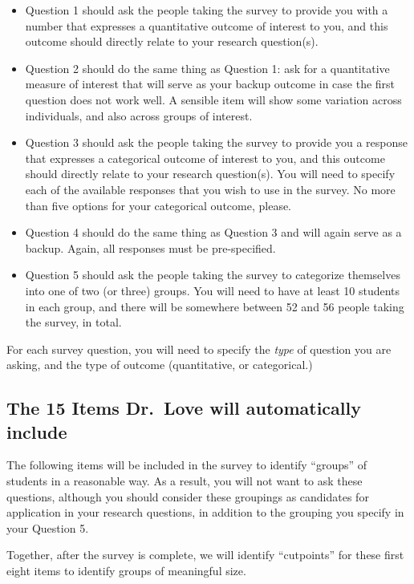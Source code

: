 \documentclass[]{book}
\providecommand{\tightlist}{%
  \setlength{\itemsep}{0pt}\setlength{\parskip}{0pt}}
\theoremstyle{definition}
\theoremstyle{definition}
\theoremstyle{definition}
\theoremstyle{remark}
\begin{document}
\begin{itemize}
\tightlist
\item
  Question 1 should ask the people taking the survey to provide you with
  a number that expresses a quantitative outcome of interest to you, and
  this outcome should directly relate to your research question(s).
\item
  Question 2 should do the same thing as Question 1: ask for a
  quantitative measure of interest that will serve as your backup
  outcome in case the first question does not work well. A sensible item
  will show some variation across individuals, and also across groups of
  interest.
\item
  Question 3 should ask the people taking the survey to provide you a
  response that expresses a categorical outcome of interest to you, and
  this outcome should directly relate to your research question(s). You
  will need to specify each of the available responses that you wish to
  use in the survey. No more than five options for your categorical
  outcome, please.
\item
  Question 4 should do the same thing as Question 3 and will again serve
  as a backup. Again, all responses must be pre-specified.
\item
  Question 5 should ask the people taking the survey to categorize
  themselves into one of two (or three) groups. You will need to have at
  least 10 students in each group, and there will be somewhere between
  52 and 56 people taking the survey, in total.
\end{itemize}

For each survey question, you will need to specify the \emph{type} of
question you are asking, and the type of outcome (quantitative, or
categorical.)

\hypertarget{the-15-items-dr.love-will-automatically-include}{%
\subsection{The 15 Items Dr.~Love will automatically
include}\label{the-15-items-dr.love-will-automatically-include}}

The following items will be included in the survey to identify
``groups'' of students in a reasonable way. As a result, you will not
want to ask these questions, although you should consider these
groupings as candidates for application in your research questions, in
addition to the grouping you specify in your Question 5.

Together, after the survey is complete, we will identify ``cutpoints''
for these first eight items to identify groups of meaningful size.
\end{document}

